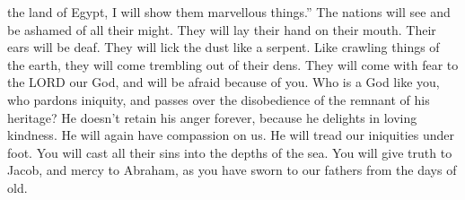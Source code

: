 the land of Egypt, I will show them marvellous things.'' 
The nations will see and be ashamed of all their might. They will lay
their hand on their mouth. Their ears will be deaf.  They
will lick the dust like a serpent. Like crawling things of the earth,
they will come trembling out of their dens. They will come with fear to
the LORD our God, and will be afraid because of you.  Who
is a God like you, who pardons iniquity, and passes over the
disobedience of the remnant of his heritage? He doesn't retain his anger
forever, because he delights in loving kindness.  He will
again have compassion on us. He will tread our iniquities under foot.
You will cast all their sins into the depths of the sea. 
You will give truth to Jacob, and mercy to Abraham, as you have sworn to
our fathers from the days of old.
